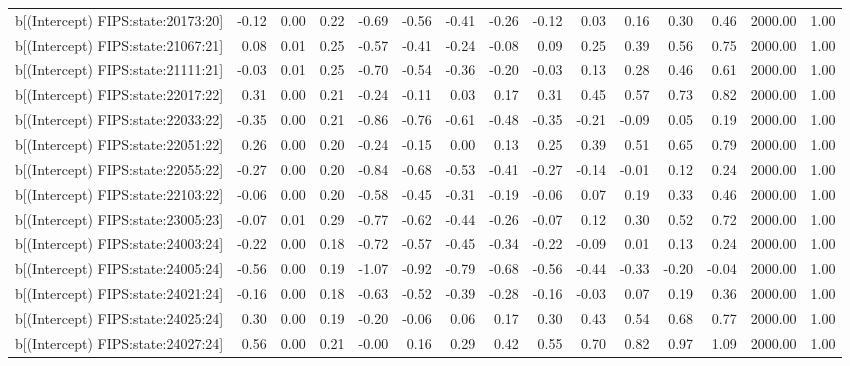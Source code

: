 \begin{table}[ht]
\begin{tabular}{rrrrrrrrrrrrrrr}
  b[(Intercept) FIPS:state:20173:20] & -0.12 & 0.00 & 0.22 & -0.69 & -0.56 & -0.41 & -0.26 & -0.12 & 0.03 & 0.16 & 0.30 & 0.46 & 2000.00 & 1.00 \\ 
  b[(Intercept) FIPS:state:21067:21] & 0.08 & 0.01 & 0.25 & -0.57 & -0.41 & -0.24 & -0.08 & 0.09 & 0.25 & 0.39 & 0.56 & 0.75 & 2000.00 & 1.00 \\ 
  b[(Intercept) FIPS:state:21111:21] & -0.03 & 0.01 & 0.25 & -0.70 & -0.54 & -0.36 & -0.20 & -0.03 & 0.13 & 0.28 & 0.46 & 0.61 & 2000.00 & 1.00 \\ 
  b[(Intercept) FIPS:state:22017:22] & 0.31 & 0.00 & 0.21 & -0.24 & -0.11 & 0.03 & 0.17 & 0.31 & 0.45 & 0.57 & 0.73 & 0.82 & 2000.00 & 1.00 \\ 
  b[(Intercept) FIPS:state:22033:22] & -0.35 & 0.00 & 0.21 & -0.86 & -0.76 & -0.61 & -0.48 & -0.35 & -0.21 & -0.09 & 0.05 & 0.19 & 2000.00 & 1.00 \\ 
  b[(Intercept) FIPS:state:22051:22] & 0.26 & 0.00 & 0.20 & -0.24 & -0.15 & 0.00 & 0.13 & 0.25 & 0.39 & 0.51 & 0.65 & 0.79 & 2000.00 & 1.00 \\ 
  b[(Intercept) FIPS:state:22055:22] & -0.27 & 0.00 & 0.20 & -0.84 & -0.68 & -0.53 & -0.41 & -0.27 & -0.14 & -0.01 & 0.12 & 0.24 & 2000.00 & 1.00 \\ 
  b[(Intercept) FIPS:state:22103:22] & -0.06 & 0.00 & 0.20 & -0.58 & -0.45 & -0.31 & -0.19 & -0.06 & 0.07 & 0.19 & 0.33 & 0.46 & 2000.00 & 1.00 \\ 
  b[(Intercept) FIPS:state:23005:23] & -0.07 & 0.01 & 0.29 & -0.77 & -0.62 & -0.44 & -0.26 & -0.07 & 0.12 & 0.30 & 0.52 & 0.72 & 2000.00 & 1.00 \\ 
  b[(Intercept) FIPS:state:24003:24] & -0.22 & 0.00 & 0.18 & -0.72 & -0.57 & -0.45 & -0.34 & -0.22 & -0.09 & 0.01 & 0.13 & 0.24 & 2000.00 & 1.00 \\ 
  b[(Intercept) FIPS:state:24005:24] & -0.56 & 0.00 & 0.19 & -1.07 & -0.92 & -0.79 & -0.68 & -0.56 & -0.44 & -0.33 & -0.20 & -0.04 & 2000.00 & 1.00 \\ 
  b[(Intercept) FIPS:state:24021:24] & -0.16 & 0.00 & 0.18 & -0.63 & -0.52 & -0.39 & -0.28 & -0.16 & -0.03 & 0.07 & 0.19 & 0.36 & 2000.00 & 1.00 \\ 
  b[(Intercept) FIPS:state:24025:24] & 0.30 & 0.00 & 0.19 & -0.20 & -0.06 & 0.06 & 0.17 & 0.30 & 0.43 & 0.54 & 0.68 & 0.77 & 2000.00 & 1.00 \\ 
  b[(Intercept) FIPS:state:24027:24] & 0.56 & 0.00 & 0.21 & -0.00 & 0.16 & 0.29 & 0.42 & 0.55 & 0.70 & 0.82 & 0.97 & 1.09 & 2000.00 & 1.00 \\ 

\end{tabular}
\end{table}
